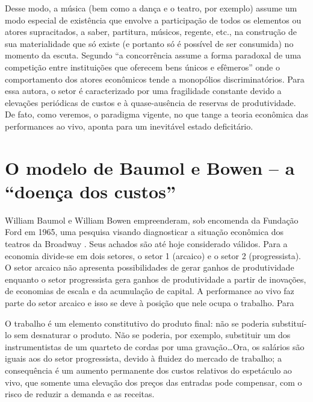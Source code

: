 \documentclass[a4paper, 12pt, openright, oneside, german, french, english, brazil]{abntex2}
\begin{document}
	Desse modo, a música (bem como a dança e o teatro, por exemplo) assume um modo especial de existência que envolve a participação de todos os elementos ou atores supracitados, a saber, partitura, músicos, regente, etc., na construção de sua materialidade que só existe (e portanto só é possível de ser consumida) no momento da escuta. Segundo  ``a concorrência assume a forma paradoxal de uma competição entre instituições que oferecem bens únicos e efêmeros'' onde o comportamento dos atores econômicos tende a monopólios discriminatórios. Para essa autora, o setor é caracterizado por uma fragilidade constante devido a elevações periódicas de custos e à quase-ausência de reservas de produtividade. De fato, como veremos, o paradigma vigente, no que tange a teoria econômica das performances ao vivo, aponta para um inevitável estado deficitário.
	
	\section{O modelo de Baumol e Bowen -- a ``doença dos custos''}
	
	William Baumol e William Bowen empreenderam, sob encomenda da Fundação Ford em 1965, uma pesquisa visando diagnosticar a situação econômica dos teatros da Broadway \cite{benhamou2007economia}. Seus achados são até hoje considerado válidos. Para  a economia divide-se em dois setores, o setor 1 (arcaico) e o setor 2 (progressista). O setor arcaico não apresenta possibilidades de gerar ganhos de produtividade enquanto o setor progressista gera ganhos de produtividade a partir de inovações, de economias de escala e da acumulação de capital. A performance ao vivo faz parte do setor arcaico e isso se deve à posição que nele ocupa o trabalho. Para 
	
	\begin{citacao}
		O trabalho é um elemento constitutivo do produto final: não se poderia substituí-lo sem desnaturar o produto. Não se poderia, por exemplo, substituir um dos instrumentistas de um quarteto de cordas por uma gravação\ldots Ora, os salários são iguais aos do setor progressista, devido à fluidez do mercado de trabalho; a consequência é um aumento permanente dos custos relativos do espetáculo ao vivo, que somente uma elevação dos preços das entradas pode compensar, com o risco de reduzir a demanda e as receitas. 
	\end{citacao}
	
\end{document}
